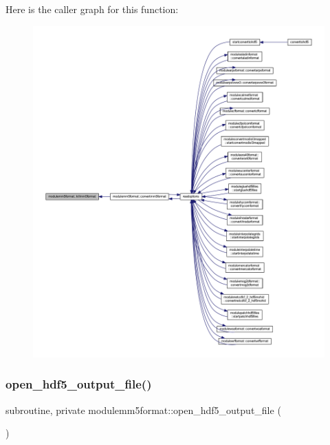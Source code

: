 Here is the caller graph for this function\+:\nopagebreak
\begin{figure}[H]
\begin{center}
\leavevmode
\includegraphics[width=350pt]{namespacemodulemm5format_a2c04440614e11a95fbe1732cd8110590_icgraph}
\end{center}
\end{figure}
\mbox{\label{namespacemodulemm5format_aeb412a3427b8b95fd51d277cd343e346}} 
\subsubsection{\texorpdfstring{open\+\_\+hdf5\+\_\+output\+\_\+file()}{open\_hdf5\_output\_file()}}
{\footnotesize\ttfamily subroutine, private modulemm5format\+::open\+\_\+hdf5\+\_\+output\+\_\+file (\begin{DoxyParamCaption}{ }\end{DoxyParamCaption})\hspace{0.3cm}{\ttfamily [private]}}

